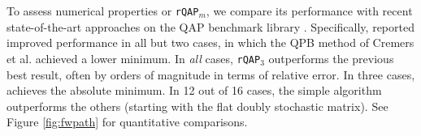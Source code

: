 \documentclass[10pt,journal,cspaper,compsoc]{IEEEtran}
\begin{document}
To assess numerical properties or \texttt{rQAP}$_m$, we compare its performance with recent state-of-the-art approaches on the QAP benchmark library \cite{Burkard1997}.  Specifically, \cite{Zaslavskiy2009} reported improved performance in all but two cases, in which the QPB method of Cremers et al. \cite{Schellewald2001} achieved a lower minimum.  
In \emph{all} cases, \texttt{rQAP}$_3$ outperforms the previous best result, often by orders of magnitude in terms of relative error. In three cases, \rqapb achieves the absolute minimum.  In 12 out of 16 cases, the simple \rqapa algorithm outperforms the others (starting with the flat doubly stochastic matrix).  See Figure \ref{fig:fwpath} for quantitative comparisons.


\end{document}
